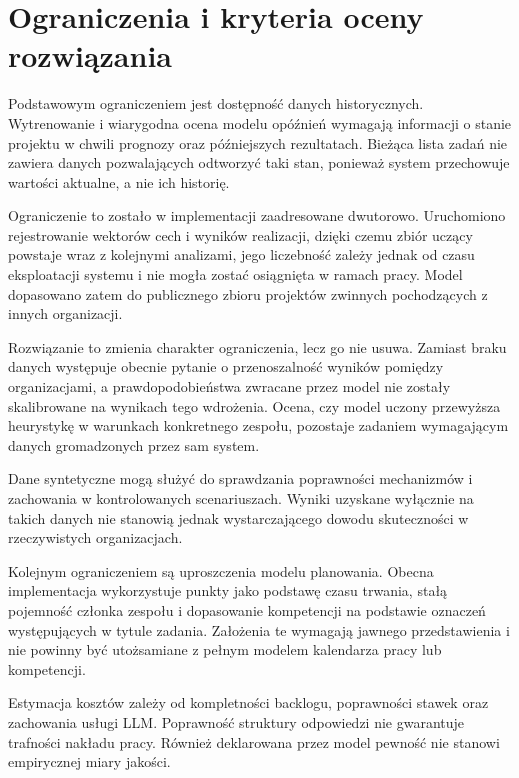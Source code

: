 \section{Ograniczenia i kryteria oceny rozwiązania}
\label{sec:ograniczenia-i-kryteria}

Podstawowym ograniczeniem jest dostępność danych historycznych. Wytrenowanie i wiarygodna ocena modelu opóźnień wymagają informacji o stanie projektu w chwili prognozy oraz późniejszych rezultatach. Bieżąca lista zadań nie zawiera danych pozwalających odtworzyć taki stan, ponieważ system przechowuje wartości aktualne, a nie ich historię.

Ograniczenie to zostało w implementacji zaadresowane dwutorowo. Uruchomiono rejestrowanie wektorów cech i wyników realizacji, dzięki czemu zbiór uczący powstaje wraz z kolejnymi analizami, jego liczebność zależy jednak od czasu eksploatacji systemu i nie mogła zostać osiągnięta w ramach pracy. Model dopasowano zatem do publicznego zbioru projektów zwinnych pochodzących z innych organizacji.

Rozwiązanie to zmienia charakter ograniczenia, lecz go nie usuwa. Zamiast braku danych występuje obecnie pytanie o przenoszalność wyników pomiędzy organizacjami, a prawdopodobieństwa zwracane przez model nie zostały skalibrowane na wynikach tego wdrożenia. Ocena, czy model uczony przewyższa heurystykę w warunkach konkretnego zespołu, pozostaje zadaniem wymagającym danych gromadzonych przez sam system.

Dane syntetyczne mogą służyć do sprawdzania poprawności mechanizmów i zachowania w kontrolowanych scenariuszach. Wyniki uzyskane wyłącznie na takich danych nie stanowią jednak wystarczającego dowodu skuteczności w rzeczywistych organizacjach.

Kolejnym ograniczeniem są uproszczenia modelu planowania. Obecna implementacja wykorzystuje punkty jako podstawę czasu trwania, stałą pojemność członka zespołu i dopasowanie kompetencji na podstawie oznaczeń występujących w tytule zadania. Założenia te wymagają jawnego przedstawienia i nie powinny być utożsamiane z pełnym modelem kalendarza pracy lub kompetencji.

Estymacja kosztów zależy od kompletności backlogu, poprawności stawek oraz zachowania usługi LLM. Poprawność struktury odpowiedzi nie gwarantuje trafności nakładu pracy. Również deklarowana przez model pewność nie stanowi empirycznej miary jakości.

